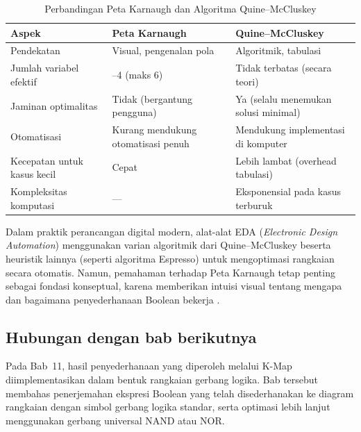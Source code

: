 \begin{table}[H]
\centering
\renewcommand{\arraystretch}{1.3}
\begin{tabular}{|>{\raggedright\arraybackslash}p{4.5cm}|>{\raggedright\arraybackslash}p{4.5cm}|>{\raggedright\arraybackslash}p{4.5cm}|}
\hline
\textbf{Aspek} & \textbf{Peta Karnaugh} & \textbf{Quine--McCluskey} \\ \hline
Pendekatan & Visual, pengenalan pola & Algoritmik, tabulasi \\ \hline
Jumlah variabel efektif & 2--4 (maks 6) & Tidak terbatas (secara teori) \\ \hline
Jaminan optimalitas & Tidak (bergantung pengguna) & Ya (selalu menemukan solusi minimal) \\ \hline
Otomatisasi & Kurang mendukung otomatisasi penuh & Mendukung implementasi di komputer \\ \hline
Kecepatan untuk kasus kecil & Cepat & Lebih lambat (overhead tabulasi) \\ \hline
Kompleksitas komputasi & --- & Eksponensial pada kasus terburuk \\ \hline
\end{tabular}
\caption{Perbandingan Peta Karnaugh dan Algoritma Quine--McCluskey}
\label{tab:kmap-vs-qm}
\end{table}

Dalam praktik perancangan digital modern, alat-alat EDA (\textit{Electronic Design Automation}) menggunakan varian algoritmik dari Quine--McCluskey beserta heuristik lainnya (seperti algoritma Espresso) untuk mengoptimasi rangkaian secara otomatis. Namun, pemahaman terhadap Peta Karnaugh tetap penting sebagai fondasi konseptual, karena memberikan intuisi visual tentang mengapa dan bagaimana penyederhanaan Boolean bekerja \cite{wiki_quine_mccluskey}.

\subsection{Hubungan dengan bab berikutnya}

Pada Bab~11, hasil penyederhanaan yang diperoleh melalui K-Map diimplementasikan dalam bentuk rangkaian gerbang logika. Bab tersebut membahas penerjemahan ekspresi Boolean yang telah disederhanakan ke diagram rangkaian dengan simbol gerbang logika standar, serta optimasi lebih lanjut menggunakan gerbang universal NAND atau NOR.
